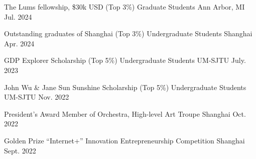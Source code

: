 

\begin{cvhonors}  %
  \cvhonor
  {The Lums fellowship, \$30k USD (Top 3\%)} %
  {Graduate Students} %
  {Ann Arbor, MI} %
  {Jul. 2024} %
  
  \cvhonor
    {Outstanding graduates of Shanghai (Top 3\%)} %
    {Undergraduate Students} %
    {Shanghai} %
    {Apr. 2024} %


  

  \cvhonor
    {GDP Explorer Scholarship (Top 5\%)} %
    {Undergraduate Students} %
    {UM-SJTU} %
    {July. 2023} %

  \cvhonor
    {John Wu \& Jane Sun Sunshine Scholarship (Top 5\%)} %
    {Undergraduate Students} %
    {UM-SJTU} %
    {Nov. 2022} %

  \cvhonor
  {President's Award} %
  {Member of Orchestra, High-level Art Troupe} %
  {Shanghai} %
  {Oct. 2022} %


  \cvhonor
  {Golden Prize} %
  {“Internet+” Innovation Entrepreneurship Competition} %
  {Shanghai} %
  {Sept. 2022} %





\end{cvhonors}
